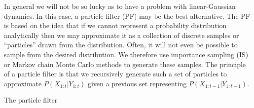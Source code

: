 In general we will not be so lucky as to have a problem with linear-Gaussian dynamics. In this case, a particle filter (PF) may be the best alternative. The PF is based on the idea that if we cannot represent a probability distribution analytically then we may approximate it as a collection of discrete samples or ``particles'' drawn from the distribution. Often, it will not even be possible to sample from the desired distribution. We therefore use importance sampling (IS) or Markov chain Monte Carlo methods to generate these samples. The principle of a particle filter is that we recursively generate such a set of particles to approximate $P(X_{1:t}|Y_{1:t})$ given a previous set representing $P(X_{1:t-1}|Y_{1:t-1})$.

The particle filter 